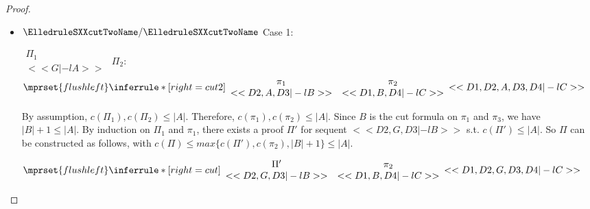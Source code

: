\begin{proof}
\begin{enumerate}
\begin{itemize}
    \item $\ElledruleSXXcutTwoName/\ElledruleSXXcutTwoName$ Case 1:
      \begin{center}
        \scriptsize
        \begin{math}
          \begin{array}{c}
            \Pi_1 \\
            {<<G |-l A>>}
          \end{array}
        \end{math}
        \qquad\qquad
        $\Pi_2:$
        \begin{math}
          $$\mprset{flushleft}
          \inferrule* [right={\tiny cut2}] {
            {
              \begin{array}{cc}
                \pi_1 & \pi_2 \\
                {<<D2, A, D3 |-l B>>} & {<<D1, B, D4 |-l C>>}
              \end{array}
            }
          }{<<D1, D2, A, D3, D4 |-l C>>}
        \end{math}
      \end{center}
      By assumption, $c(\Pi_1),c(\Pi_2)\leq |A|$. Therefore, $c(\pi_1),c(\pi_2)\leq |A|$.
      Since $B$ is the cut formula on $\pi_1$ and $\pi_3$, we have $|B|+1\leq|A|$. By
      induction on $\Pi_1$ and $\pi_1$, there exists a proof $\Pi'$ for sequent
      $<<D2, G, D3 |-l B>>$ s.t. $c(\Pi')\leq|A|$. So $\Pi$ can be constructed as follows,
      with $c(\Pi)\leq max\{c(\Pi'),c(\pi_2),|B|+1\}\leq |A|$.
      \begin{center}
        \scriptsize
        \begin{math}
          $$\mprset{flushleft}
          \inferrule* [right={\tiny cut}] {
            {
              \begin{array}{cc}
                \Pi' & \pi_2 \\
                {<<D2, G, D3 |-l B>>} & {<<D1, B, D4 |-l C>>}
              \end{array}
            }
          }{<<D1, D2, G, D3, D4 |-l C>>}
        \end{math}
      \end{center}


\end{itemize}
\end{enumerate}
\end{proof}
